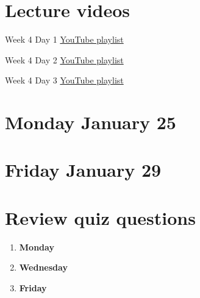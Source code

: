 \documentclass[12pt, oneside]{article}
\begin{document}
\section*{Lecture videos}
Week 4 Day 1
\href{https://youtube.com/playlist?list=PLML4QilACLk47QBNBgn3XU9VKJteswzfV}{YouTube playlist}

Week 4 Day 2
\href{https://youtube.com/playlist?list=PLML4QilACLk7ZmUbf4VXu8oUqcVmPMl4l}{YouTube playlist}

Week 4 Day 3
\href{https://youtube.com/playlist?list=PLML4QilACLk496T5XZ30JKU-t1iVaHIXm}{YouTube playlist}

\newpage
\section*{Monday January 25}






\newpage




\newpage




\section*{Friday January 29}







\newpage





\section*{Review quiz questions}

\begin{enumerate}


\item {\bf Monday}


\item {\bf Wednesday}



\newpage

\item {\bf Friday} 

\end{enumerate}
\end{document}
